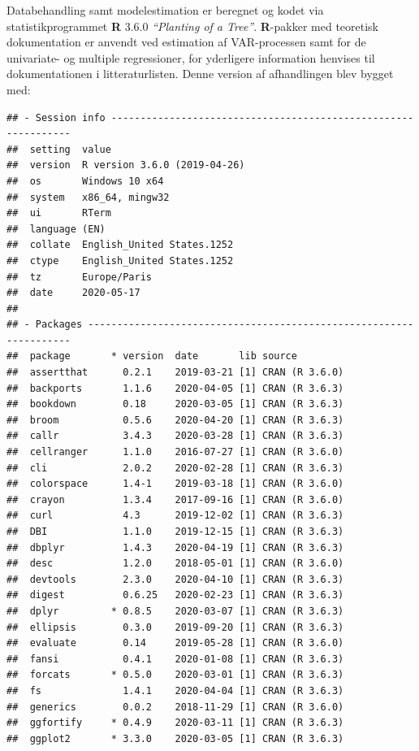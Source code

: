 \documentclass[
  a4paper,
  oneside]{memoir}
\begin{document}
Databehandling samt modelestimation er beregnet og kodet via statistikprogrammet \textbf{R} 3.6.0 \emph{``Planting of a Tree''}. \textbf{R}-pakker med teoretisk dokumentation er anvendt ved estimation af VAR-processen samt for de univariate- og multiple regressioner, for yderligere information henvises til dokumentationen i litteraturlisten. Denne version af afhandlingen blev bygget med:

\begin{verbatim}
## - Session info ---------------------------------------------------------------
##  setting  value                       
##  version  R version 3.6.0 (2019-04-26)
##  os       Windows 10 x64              
##  system   x86_64, mingw32             
##  ui       RTerm                       
##  language (EN)                        
##  collate  English_United States.1252  
##  ctype    English_United States.1252  
##  tz       Europe/Paris                
##  date     2020-05-17                  
## 
## - Packages -------------------------------------------------------------------
##  package       * version  date       lib source           
##  assertthat      0.2.1    2019-03-21 [1] CRAN (R 3.6.0)   
##  backports       1.1.6    2020-04-05 [1] CRAN (R 3.6.3)   
##  bookdown        0.18     2020-03-05 [1] CRAN (R 3.6.3)   
##  broom           0.5.6    2020-04-20 [1] CRAN (R 3.6.3)   
##  callr           3.4.3    2020-03-28 [1] CRAN (R 3.6.3)   
##  cellranger      1.1.0    2016-07-27 [1] CRAN (R 3.6.0)   
##  cli             2.0.2    2020-02-28 [1] CRAN (R 3.6.3)   
##  colorspace      1.4-1    2019-03-18 [1] CRAN (R 3.6.0)   
##  crayon          1.3.4    2017-09-16 [1] CRAN (R 3.6.0)   
##  curl            4.3      2019-12-02 [1] CRAN (R 3.6.3)   
##  DBI             1.1.0    2019-12-15 [1] CRAN (R 3.6.3)   
##  dbplyr          1.4.3    2020-04-19 [1] CRAN (R 3.6.3)   
##  desc            1.2.0    2018-05-01 [1] CRAN (R 3.6.0)   
##  devtools        2.3.0    2020-04-10 [1] CRAN (R 3.6.3)   
##  digest          0.6.25   2020-02-23 [1] CRAN (R 3.6.3)   
##  dplyr         * 0.8.5    2020-03-07 [1] CRAN (R 3.6.3)   
##  ellipsis        0.3.0    2019-09-20 [1] CRAN (R 3.6.3)   
##  evaluate        0.14     2019-05-28 [1] CRAN (R 3.6.0)   
##  fansi           0.4.1    2020-01-08 [1] CRAN (R 3.6.3)   
##  forcats       * 0.5.0    2020-03-01 [1] CRAN (R 3.6.3)   
##  fs              1.4.1    2020-04-04 [1] CRAN (R 3.6.3)   
##  generics        0.0.2    2018-11-29 [1] CRAN (R 3.6.0)   
##  ggfortify     * 0.4.9    2020-03-11 [1] CRAN (R 3.6.3)   
##  ggplot2       * 3.3.0    2020-03-05 [1] CRAN (R 3.6.3)   

\end{verbatim}
\end{document}
